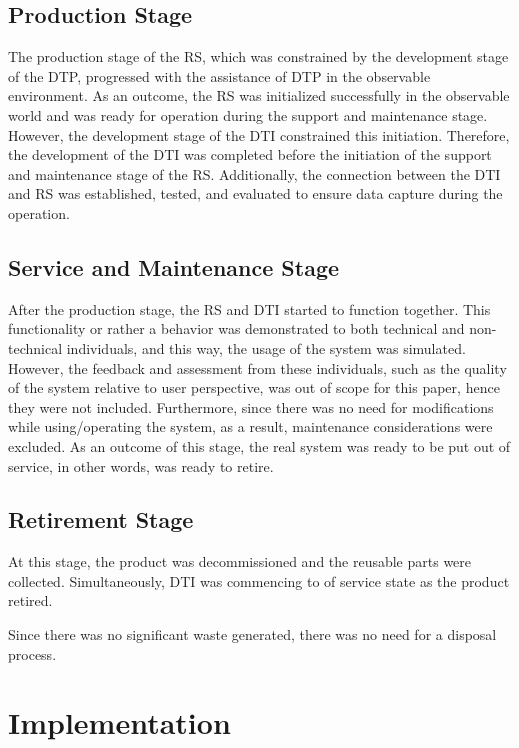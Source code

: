 \documentclass[conference]{IEEEtran}
\begin{document}
    \subsection{Production Stage}
    The production stage of the RS, which was constrained by the development stage of the DTP, progressed with the assistance of  DTP in the observable environment.  As an outcome, the RS was initialized successfully in the observable world and was ready for operation during the support and maintenance stage. However, the development stage of the DTI constrained this initiation. Therefore, the development of the DTI was completed before the initiation of the support and maintenance stage of the RS.  
    Additionally, the connection between the DTI and RS was established, tested, and evaluated to ensure data capture during the operation.

    \subsection{Service and Maintenance Stage}
    After the production stage, the RS and DTI started to function together. This functionality or rather a behavior was demonstrated to both technical and non-technical individuals, 
    and this way, the usage of the system was simulated. However, the feedback and assessment from these individuals, such as the quality of the system relative to user perspective,
    was out of scope for this paper, hence they were not included.  Furthermore, since there was no need for modifications while using/operating the system, 
    as a result, maintenance considerations were excluded. As an outcome of this stage, the real system was ready to be put out of service, in other words, was ready to retire.

    \subsection{Retirement Stage}

    At this stage, the product was decommissioned and the reusable parts were collected. Simultaneously, DTI was commencing to of service state as the product retired.

    Since there was no significant waste generated, there was no need for a disposal process.  

    \section{Implementation}\label{section:implementation}
\end{document}
